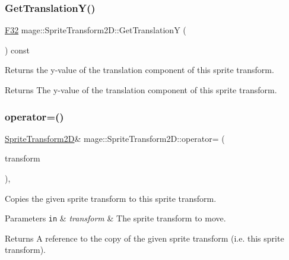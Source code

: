 \subsubsection{\texorpdfstring{Get\+Translation\+Y()}{GetTranslationY()}}
{\footnotesize\ttfamily \mbox{\hyperlink{namespacemage_aa97e833b45f06d60a0a9c4fc22ae02c0}{F32}} mage\+::\+Sprite\+Transform2\+D\+::\+Get\+TranslationY (\begin{DoxyParamCaption}{ }\end{DoxyParamCaption}) const\hspace{0.3cm}{\ttfamily [noexcept]}}

Returns the y-\/value of the translation component of this sprite transform.

\begin{DoxyReturn}{Returns}
The y-\/value of the translation component of this sprite transform. 
\end{DoxyReturn}
\mbox{\label{classmage_1_1_sprite_transform2_d_a070aaa723dd4f6615c75c11c99523cf9}} 
\subsubsection{\texorpdfstring{operator=()}{operator=()}\hspace{0.1cm}{\footnotesize\ttfamily [1/2]}}
{\footnotesize\ttfamily \mbox{\hyperlink{classmage_1_1_sprite_transform2_d}{Sprite\+Transform2D}}\& mage\+::\+Sprite\+Transform2\+D\+::operator= (\begin{DoxyParamCaption}\item[{const \mbox{\hyperlink{classmage_1_1_sprite_transform2_d}{Sprite\+Transform2D}} \&}]{transform }\end{DoxyParamCaption})\hspace{0.3cm}{\ttfamily [default]}, {\ttfamily [noexcept]}}

Copies the given sprite transform to this sprite transform.


\begin{DoxyParams}[1]{Parameters}
\mbox{\tt in}  & {\em transform} & The sprite transform to move. \\
\hline
\end{DoxyParams}
\begin{DoxyReturn}{Returns}
A reference to the copy of the given sprite transform (i.\+e. this sprite transform). 
\end{DoxyReturn}
\mbox{\label{classmage_1_1_sprite_transform2_d_a49afb6168a0db37a2cbb6d604915672d}} 
